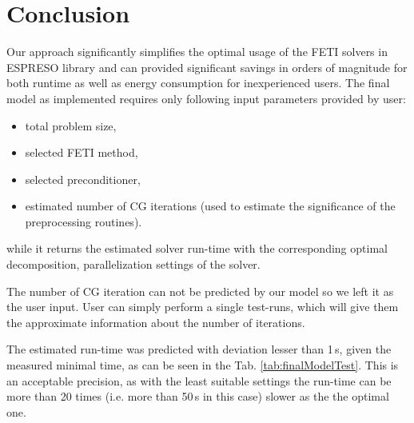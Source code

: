 \section{Conclusion}
Our approach significantly simplifies the optimal usage of the FETI solvers in ESPRESO library 
and can provided significant savings in orders of magnitude for both runtime as well as energy consumption for inexperienced users. 
The final model as implemented requires only following input parameters provided by user: 

\begin{itemize}
\item total problem size,
\item selected FETI method, 
\item selected preconditioner, 
\item estimated number of CG iterations (used to estimate the significance of the preprocessing routines).
\end{itemize}

while it returns the estimated solver run-time with the corresponding optimal 
decomposition, parallelization settings of the solver.

The number of CG iteration can not be predicted by our model so we left it as the user input.  
User can simply perform a single test-runs,  which will give them the approximate information 
about the number of iterations. 

The estimated run-time was predicted with deviation lesser than 1\,s, given the 
measured minimal time, as can be seen in the Tab. \ref{tab:finalModelTest}. 
This is an acceptable precision, as with the least suitable settings the
run-time can be more than 20 times (i.e. more than 50\,s in this case) slower  
as the the optimal one.
